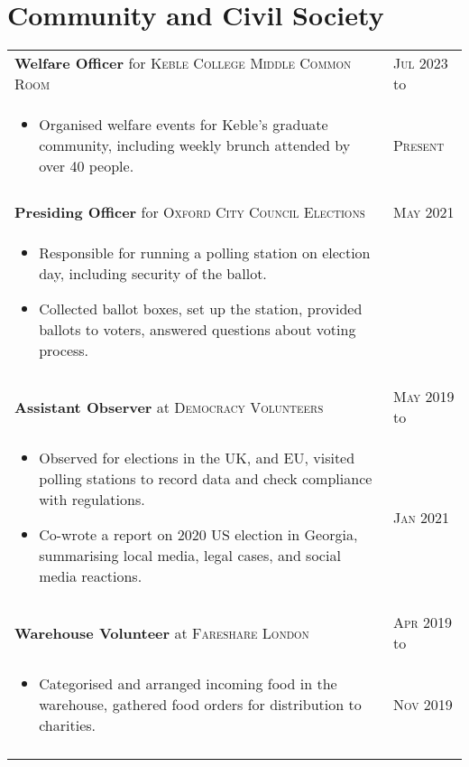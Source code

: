 \documentclass[a4paper,10pt]{article}
\newcommand{\datelen}{1.8cm}
\newcommand{\descrlen}{15.5cm}
\begin{document}
\section{Community and  Civil Society}
\begin{tabular}{p{\descrlen}|p{\datelen}}
  \textbf{Welfare Officer} for \textsc{Keble College Middle Common Room} & \textsc{Jul 2023} to\\
  \small{
  \vspace{-0.4cm}
  \begin{itemize}
  \item Organised welfare events for Keble's graduate community, including weekly brunch attended by over 40 people.
    \vspace{-0.5cm}
  \end{itemize}}&\textsc{Present}\\\multicolumn{2}{c}{} \\[-0.2cm]
  \textbf{Presiding Officer} for \textsc{Oxford City Council Elections}&\textsc{May 2021}\\
  \small{
  \vspace{-0.4cm}
  \begin{itemize}
  \item Responsible for running a polling station on election day, including security of the ballot.
  \item Collected ballot boxes, set up the station, provided ballots to voters, answered questions about voting process.
    \vspace{-0.5cm}
  \end{itemize}}&\\\multicolumn{2}{c}{} \\[-0.2cm]
  \textbf{Assistant Observer} at \textsc{Democracy Volunteers} & \textsc{May 2019} to\\
  \small{
  \vspace{-0.4cm}
  \begin{itemize}
  \item Observed for elections in the UK, and EU, visited polling stations to record data and check compliance with regulations.
  \item Co-wrote a report on 2020 US election in Georgia, summarising local media, legal cases, and social media reactions.
  \vspace{-0.5cm}
  \end{itemize}}&\textsc{Jan 2021}\\\multicolumn{2}{c}{} \\[-0.2cm]
  \textbf{Warehouse Volunteer} at \textsc{Fareshare London} & \textsc{Apr 2019} to\\
  \small{
  \vspace{-0.4cm}
  \begin{itemize}
  \item Categorised and arranged incoming food in the warehouse, gathered food orders for distribution to charities.
  \vspace{-0.5cm}
  \end{itemize}}&\textsc{Nov 2019}\\\multicolumn{2}{c}{} \\[-0.2cm]
\end{tabular}
\end{document}
